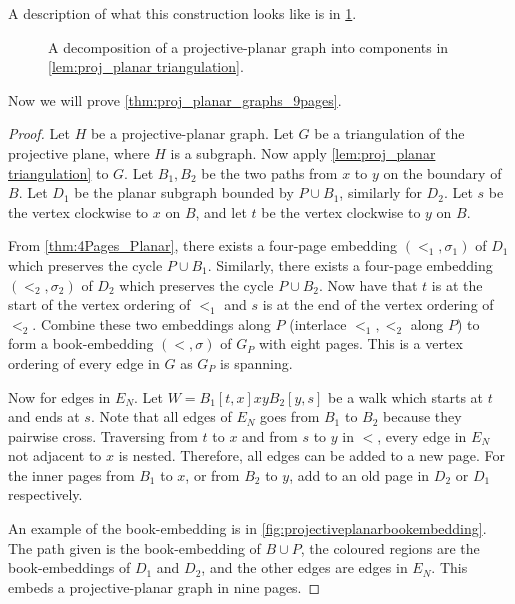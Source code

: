 A description of what this construction looks like is in \cref{fig:projectiveplanardecomp}.
\begin{figure}[h]
    \centering
    
    \caption[Projective-Planar decomposition]{A decomposition of a projective-planar graph into components in \cref{lem:proj_planar triangulation}.}\label{fig:projectiveplanardecomp}
\end{figure}

Now we will prove \cref{thm:proj_planar_graphs_9pages}.
\begin{proof}
    Let $H$ be a projective-planar graph. Let $G$ be a triangulation of the projective plane, where $H$ is a subgraph.
    Now apply \cref{lem:proj_planar triangulation} to $G$. Let $B_1, B_2$ be the two paths from $x$ to $y$ on the boundary of $B$. Let $D_1$ be the planar subgraph bounded by $P \cup B_1$, similarly for $D_2$. Let $s$ be the vertex clockwise to $x$ on $B$, and let $t$ be the vertex clockwise to $y$ on $B$.

    From \cref{thm:4Pages_Planar}, there exists a four-page embedding $(<_1, \sigma_1)$ of $D_1$ which preserves the cycle $P \cup B_1$. Similarly, there exists a four-page embedding $(<_2, \sigma_2)$ of $D_2$ which preserves the cycle $P \cup B_2$.
    Now have that $t$ is at the start of the vertex ordering of $<_1$ and $s$ is at the end of the vertex ordering of $<_2$. 
    Combine these two embeddings along $P$ (interlace $<_1, <_2$ along $P$) to form a book-embedding $(<, \sigma)$ of $G_P$ with eight pages. This is a vertex ordering of every edge in $G$ as $G_P$ is spanning. 

    Now for edges in $E_N$. Let $W = B_1[t, x] xy B_2[y, s]$ be a walk which starts at $t$ and ends at $s$. Note that all edges of $E_N$ goes from $B_1$ to $B_2$ because they pairwise cross. Traversing from $t$ to $x$ and from $s$ to $y$ in $<$, every edge in $E_N$ not adjacent to $x$ is nested. Therefore, all edges can be added to a new page. For the inner pages from $B_1$ to $x$, or from $B_2$ to $y$, add to an old page in $D_2$ or $D_1$ respectively. 

    An example of the book-embedding is in \cref{fig:projectiveplanarbookembedding}. The path given is the book-embedding of $B \cup P$, the coloured regions are the book-embeddings of $D_1$ and $D_2$, and the other edges are edges in $E_N$. 
    This embeds a projective-planar graph in nine pages.
\end{proof}


